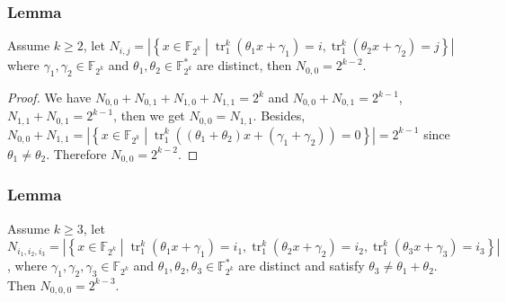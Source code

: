 \documentclass[
    aspectratio=169,                   %
]{beamer}
\newcommand{\F}{\mathbb{F}}
\newcommand{\tr}{\operatorname{tr}_1^k}
\begin{document}
    \begin{frame}
        \frametitle{Lemma}
        
        \begin{lemma}\label{lemma:N_ij_trace}
            Assume  $ k\ge 2 $, let $ N_{i,j} =\left\lvert\left\{x\in\F_{2^k}\middle|\tr\left(\theta_1x+\gamma_1\right)=i,\tr\left(\theta_2x+\gamma_2\right)=j\right\}\right\rvert $ 
            where  $ \gamma_1,\gamma_2\in\F_{2^k} $ and $ \theta_1,\theta_2\in\F_{2^k}^* $ are distinct, then $ N_{0,0} =2^{k-2} $.
        \end{lemma}   
           
        \begin{proof}
            We have $ N_{0,0}+N_{0,1}+N_{1,0}+N_{1,1}=2^k $ and $ N_{0,0}+N_{0,1}=2^{k-1} $, $ N_{1,1}+N_{0,1}=2^{k-1}  $, then we get 
            $ N_{0,0} = N_{1,1} $. 
            Besides, $ N_{0,0}+N_{1,1} = \left\lvert\left\{x\in\F_{2^k}\middle|\tr\left((\theta_1+\theta_2)x+(\gamma_1+\gamma_2)\right)=0\right\}\right\rvert=2^{k-1} $  since $ \theta_1\ne \theta_2 $. 
            Therefore $ N_{0,0}=2^{k-2} $.
        \end{proof}
    \end{frame}

        \begin{frame}
            \frametitle{Lemma}
        
            \begin{lemma}\label{lemma:N_ijk_trace}
                Assume  $ k\ge 3 $, let $ N_{i_1,i_2,i_3}=\left\lvert\left\{x\in\F_{2^k}\middle| \tr\left(\theta_1x+\gamma_1\right)=i_1,\tr\left(\theta_2x+\gamma_2\right)=i_2,\tr\left(\theta_3x+\gamma_3\right)=i_3 \right\} \right\rvert$, 
              where  $ \gamma_1,\gamma_2,\gamma_3\in\F_{2^k} $ and $ \theta_1,\theta_2,\theta_3\in\F_{2^k}^* $ are distinct and satisfy 
              $ \theta_3\ne\theta_1+\theta_2 $. Then $ N_{0,0,0}= 2^{k-3} $.
          \end{lemma}
        \end{frame}
        
\end{document}
